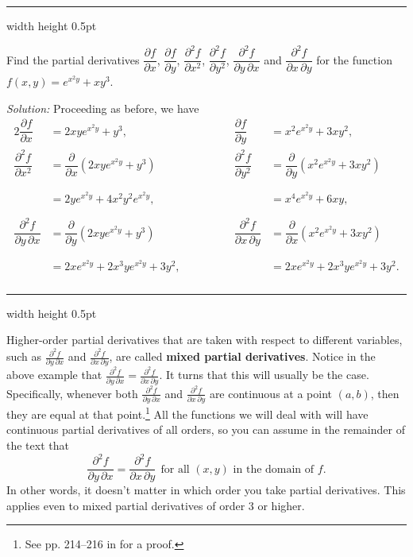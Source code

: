 \medskip
\hrule width \textwidth height 0.5pt
\begin{exmp}
 Find the partial derivatives $\dfrac{\partial f}{\partial x}$, $\dfrac{\partial f}{\partial y}$,
 $\dfrac{\partial^2 f}{\partial x^2}$,
 $\dfrac{\partial^2 f}{\partial y^2}$, $\dfrac{\partial^2 f}{\partial y \, \partial x}$ and
 $\dfrac{\partial^2 f}{\partial x \, \partial y}$ for the function
 $f(x,y) = e^{x^2 y} + xy^3$.\smallskip
 \par\noindent\emph{Solution:} Proceeding as before, we have
 \begin{alignat*}{2}
  \dfrac{\partial f}{\partial x} &= 2xy e^{x^2 y} + y^3,
  \qquad\qquad
  & \dfrac{\partial f}{\partial y} &= x^2 e^{x^2 y} + 3xy^2,
  \\
  \dfrac{\partial^2 f}{\partial x^2} &= \dfrac{\partial}{\partial x} (2xy e^{x^2 y} + y^3)\qquad\qquad
  & \dfrac{\partial^2 f}{\partial y^2} &= \dfrac{\partial}{\partial y} (x^2 e^{x^2 y} + 3xy^2)
  \\
  \phantom{\dfrac{\partial^2 f}{\partial x^2}} &= 2y e^{x^2 y} + 4x^2 y^2 e^{x^2 y},
  \qquad\qquad
   & \phantom{\dfrac{\partial^2 f}{\partial y^2}} &= x^4 e^{x^2 y} + 6xy,
   \\
  \dfrac{\partial^2 f}{\partial y \, \partial x} &= \dfrac{\partial}{\partial y} (2xy e^{x^2 y} + y^3)
  \qquad\qquad
  & \dfrac{\partial^2 f}{\partial x \, \partial y} &= \dfrac{\partial}{\partial x} (x^2 e^{x^2 y} + 3xy^2)
  \\
  \phantom{\dfrac{\partial^2 f}{\partial y \, \partial x}} &= 2x e^{x^2 y} + 2x^3 y e^{x^2 y} + 3y^2,
  \qquad\qquad
   & \phantom{\dfrac{\partial^2 f}{\partial x \, \partial y}} &= 2x e^{x^2 y} + 2x^3 y e^{x^2 y} + 3y^2.
 \end{alignat*}
\end{exmp}
\hrule width \textwidth height 0.5pt
\medskip

Higher-order partial derivatives that are taken with respect to different variables, such as
$\frac{\partial^2 f}{\partial y \, \partial x}$ and $\frac{\partial^2 f}{\partial x \, \partial y}$, are called
\textbf{mixed partial derivatives}.
Notice in the above example that $\frac{\partial^2 f}{\partial y \, \partial x} =
\frac{\partial^2 f}{\partial x \, \partial y}$. 
It turns that this will usually be the case. 
Specifically,
whenever both $\frac{\partial^2 f}{\partial y \, \partial x}$ and $\frac{\partial^2 f}{\partial x \, \partial y}$ are
continuous at a point $(a,b)$, then they are equal at that point.\footnote{See pp. 214--216
in \cite{tm} for a proof.} All the functions we will deal with will have continuous partial derivatives of all
orders, so you can assume in the remainder of the text that
\begin{displaymath}
 \frac{\partial^2 f}{\partial y \, \partial x} = \frac{\partial^2 f}{\partial x \, \partial y} ~~
 \text{for all $(x,y)$ in the domain of $f$.}
\end{displaymath}
In other words, it doesn't matter
in which order you take partial derivatives. 
This applies even to mixed partial derivatives of order $3$ or higher.

